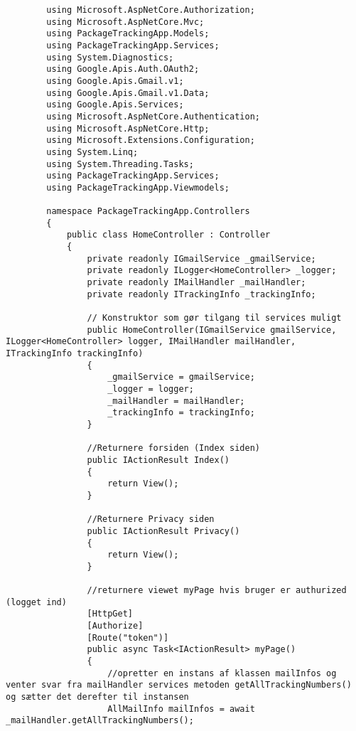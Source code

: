 \begin{verbatim}
        using Microsoft.AspNetCore.Authorization;
        using Microsoft.AspNetCore.Mvc;
        using PackageTrackingApp.Models;
        using PackageTrackingApp.Services;
        using System.Diagnostics;
        using Google.Apis.Auth.OAuth2;
        using Google.Apis.Gmail.v1;
        using Google.Apis.Gmail.v1.Data;
        using Google.Apis.Services;
        using Microsoft.AspNetCore.Authentication;
        using Microsoft.AspNetCore.Http;
        using Microsoft.Extensions.Configuration;
        using System.Linq;
        using System.Threading.Tasks;
        using PackageTrackingApp.Services;
        using PackageTrackingApp.Viewmodels;
        
        namespace PackageTrackingApp.Controllers
        {
            public class HomeController : Controller
            {
                private readonly IGmailService _gmailService;
                private readonly ILogger<HomeController> _logger;
                private readonly IMailHandler _mailHandler;
                private readonly ITrackingInfo _trackingInfo;
        
                // Konstruktor som gør tilgang til services muligt
                public HomeController(IGmailService gmailService, ILogger<HomeController> logger, IMailHandler mailHandler, ITrackingInfo trackingInfo)
                {
                    _gmailService = gmailService;
                    _logger = logger;
                    _mailHandler = mailHandler;
                    _trackingInfo = trackingInfo;
                }
        
                //Returnere forsiden (Index siden)
                public IActionResult Index()
                {
                    return View();
                }
        
                //Returnere Privacy siden
                public IActionResult Privacy()
                {
                    return View();
                }
        
                //returnere viewet myPage hvis bruger er authurized (logget ind)
                [HttpGet]
                [Authorize]
                [Route("token")]
                public async Task<IActionResult> myPage()
                {
                    //opretter en instans af klassen mailInfos og venter svar fra mailHandler services metoden getAllTrackingNumbers() og sætter det derefter til instansen
                    AllMailInfo mailInfos = await _mailHandler.getAllTrackingNumbers();
        

\end{verbatim}
